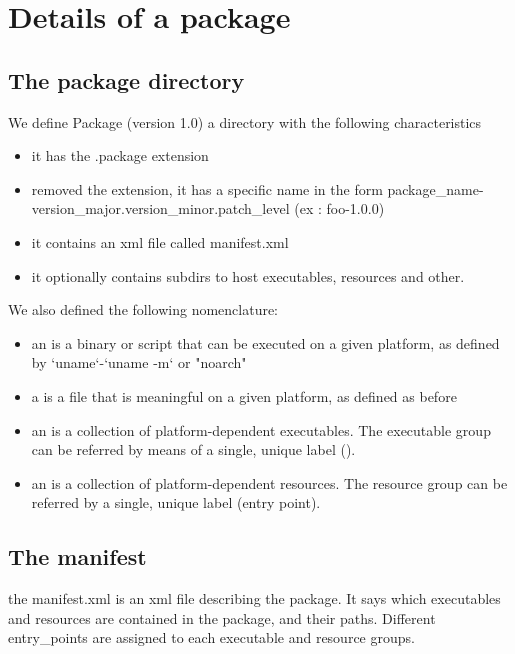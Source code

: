 \section{Details of a package}

\subsection{The package directory}

We define Package (version 1.0) a directory with the following characteristics

\begin{itemize}
\item it has the .package extension
\item removed the extension, it has a specific name in the form package\_name-version\_major.version\_minor.patch\_level (ex : foo-1.0.0)
\item it contains an xml file called manifest.xml
\item it optionally contains subdirs to host executables, resources and other.
\end{itemize}

We also defined the following nomenclature:
\begin{itemize}
\item an  is a binary or script that can be executed on a given platform, as defined by `uname`-`uname -m` or "noarch"
\item a  is a file that is meaningful on a given platform, as defined as before
\item an  is a collection of platform-dependent executables. The executable group can be referred by means of a single, unique label ().
\item an  is a collection of platform-dependent resources. The resource group can be referred by a single, unique label (entry point).
\end{itemize}

\subsection{The manifest}

the manifest.xml is an xml file describing the package. It says which
executables and resources are contained in the package, and their paths.
Different entry\_points are assigned to each executable and resource groups.

